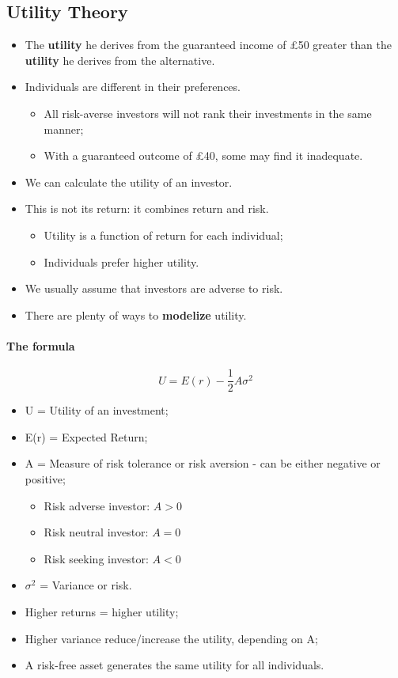 \documentclass[11pt,a4paper]{report}
\begin{document}
\subsection{Utility Theory}
\begin{itemize}
    \item The \textbf{utility} he derives from the guaranteed income of £50 greater than the \textbf{utility} he derives from the alternative.
    \item Individuals are different in their preferences.
    \begin{itemize}
        \item All risk-averse investors will not rank their investments in the same manner;
        \item With a guaranteed outcome of £40, some may find it inadequate.
    \end{itemize}
    \item We can calculate the utility of an investor.
    \item This is not its return: it combines return and risk.
    \begin{itemize}
        \item Utility is a function of return for each individual;
        \item Individuals prefer higher utility.
    \end{itemize}
    \item We usually assume that investors are adverse to risk.
    \item There are plenty of ways to \textbf{modelize} utility.
\end{itemize}
\paragraph{The formula} \[U = E(r) - \frac{1}{2}A\sigma^2\]
\begin{itemize}
    \item U = Utility of an investment;
    \item E(r) = Expected Return;
    \item A = Measure of risk tolerance or risk aversion - can be either negative or positive;
    \begin{itemize}
        \item Risk adverse investor: $A>0$
        \item Risk neutral investor: $A=0$
        \item Risk seeking investor: $A<0$
    \end{itemize}
    \item $\sigma^2$ = Variance or risk.
    \item Higher returns = higher utility;
    \item Higher variance reduce/increase the utility, depending on A;
    \item A risk-free asset generates the same utility for all individuals.
\end{itemize}
\end{document}
